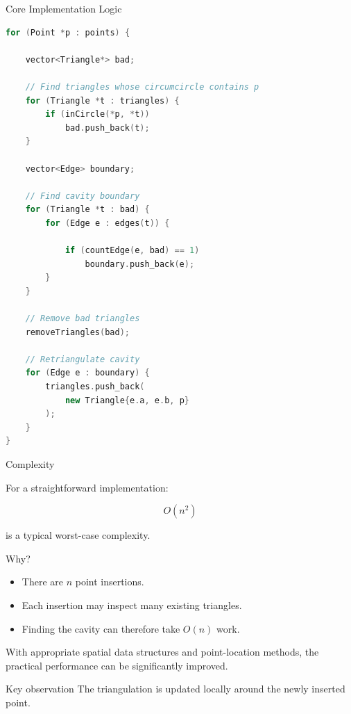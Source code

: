 \documentclass[aspectratio=169]{beamer}
\begin{document}
\begin{frame}[fragile]{Core Implementation Logic}

\begin{lstlisting}[language=C++,basicstyle=\ttfamily\scriptsize]
for (Point *p : points) {

    vector<Triangle*> bad;

    // Find triangles whose circumcircle contains p
    for (Triangle *t : triangles) {
        if (inCircle(*p, *t))
            bad.push_back(t);
    }

    vector<Edge> boundary;

    // Find cavity boundary
    for (Triangle *t : bad) {
        for (Edge e : edges(t)) {

            if (countEdge(e, bad) == 1)
                boundary.push_back(e);
        }
    }

    // Remove bad triangles
    removeTriangles(bad);

    // Retriangulate cavity
    for (Edge e : boundary) {
        triangles.push_back(
            new Triangle{e.a, e.b, p}
        );
    }
}
\end{lstlisting}

\end{frame}

\begin{frame}{Complexity}

For a straightforward implementation:

\[
\boxed{O(n^2)}
\]

is a typical worst-case complexity.

Why?

\begin{itemize}
    \item There are $n$ point insertions.
    \item Each insertion may inspect many existing triangles.
    \item Finding the cavity can therefore take $O(n)$ work.
\end{itemize}

With appropriate spatial data structures and point-location methods,
the practical performance can be significantly improved.

\vspace{0.3cm}

\begin{block}{Key observation}
The triangulation is updated locally around the newly inserted point.
\end{block}

\end{frame}
\end{document}
